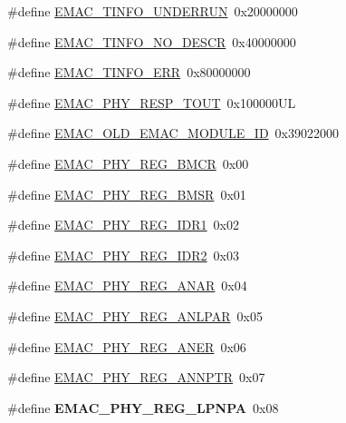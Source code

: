 \begin{DoxyCompactItemize}
$$\#define \hyperlink{group___e_m_a_c___private___macros_ga8d35ba8cad9f933994f4e47037a448f7}{\-E\-M\-A\-C\-\_\-\-T\-I\-N\-F\-O\-\_\-\-U\-N\-D\-E\-R\-R\-U\-N}~0x20000000
\item 
\#define \hyperlink{group___e_m_a_c___private___macros_gaa2b069768127d20748a33b0557288e1a}{\-E\-M\-A\-C\-\_\-\-T\-I\-N\-F\-O\-\_\-\-N\-O\-\_\-\-D\-E\-S\-C\-R}~0x40000000
\item 
\#define \hyperlink{group___e_m_a_c___private___macros_ga5fa017a32d7cc8ad4d3e7bd29daa61a9}{\-E\-M\-A\-C\-\_\-\-T\-I\-N\-F\-O\-\_\-\-E\-R\-R}~0x80000000
\item 
\#define \hyperlink{group___e_m_a_c___private___macros_gac7f3564ded9d9f076b675010c8c73b0a}{\-E\-M\-A\-C\-\_\-\-P\-H\-Y\-\_\-\-R\-E\-S\-P\-\_\-\-T\-O\-U\-T}~0x100000\-U\-L
\item 
\#define \hyperlink{group___e_m_a_c___private___macros_gabd5c245035822a9d8071fb36ba40ada2}{\-E\-M\-A\-C\-\_\-\-O\-L\-D\-\_\-\-E\-M\-A\-C\-\_\-\-M\-O\-D\-U\-L\-E\-\_\-\-I\-D}~0x39022000
\item 
\#define \hyperlink{group___e_m_a_c___private___macros_ga668453deab2030352349c9878f187689}{\-E\-M\-A\-C\-\_\-\-P\-H\-Y\-\_\-\-R\-E\-G\-\_\-\-B\-M\-C\-R}~0x00
\item 
\#define \hyperlink{group___e_m_a_c___private___macros_ga2a8674b42b04e5ba80a0f545b8b27f5a}{\-E\-M\-A\-C\-\_\-\-P\-H\-Y\-\_\-\-R\-E\-G\-\_\-\-B\-M\-S\-R}~0x01
\item 
\#define \hyperlink{group___e_m_a_c___private___macros_ga172d9870c434467cca494d575256bad8}{\-E\-M\-A\-C\-\_\-\-P\-H\-Y\-\_\-\-R\-E\-G\-\_\-\-I\-D\-R1}~0x02
\item 
\#define \hyperlink{group___e_m_a_c___private___macros_gae4dc606cc62e123eb9cf1ec842104615}{\-E\-M\-A\-C\-\_\-\-P\-H\-Y\-\_\-\-R\-E\-G\-\_\-\-I\-D\-R2}~0x03
\item 
\#define \hyperlink{group___e_m_a_c___private___macros_ga2528e41a571096f5eb4069ed926e7eae}{\-E\-M\-A\-C\-\_\-\-P\-H\-Y\-\_\-\-R\-E\-G\-\_\-\-A\-N\-A\-R}~0x04
\item 
\#define \hyperlink{group___e_m_a_c___private___macros_gaafbe7f7e4183bb3b58fcd5b5576e22ef}{\-E\-M\-A\-C\-\_\-\-P\-H\-Y\-\_\-\-R\-E\-G\-\_\-\-A\-N\-L\-P\-A\-R}~0x05
\item 
\#define \hyperlink{group___e_m_a_c___private___macros_ga5d6f772d0ed378dc1f51723e8ad4c88c}{\-E\-M\-A\-C\-\_\-\-P\-H\-Y\-\_\-\-R\-E\-G\-\_\-\-A\-N\-E\-R}~0x06
\item 
\#define \hyperlink{group___e_m_a_c___private___macros_ga1e8c3178ceb91ddde7b094854c093f83}{\-E\-M\-A\-C\-\_\-\-P\-H\-Y\-\_\-\-R\-E\-G\-\_\-\-A\-N\-N\-P\-T\-R}~0x07
\item 
\hypertarget{group___e_m_a_c___private___macros_gac75e067f0b4bb3e64ccc821435270f21}{\#define {\bfseries \-E\-M\-A\-C\-\_\-\-P\-H\-Y\-\_\-\-R\-E\-G\-\_\-\-L\-P\-N\-P\-A}~0x08}\label{group___e_m_a_c___private___macros_gac75e067f0b4bb3e64ccc821435270f21}


\end{DoxyCompactItemize}

